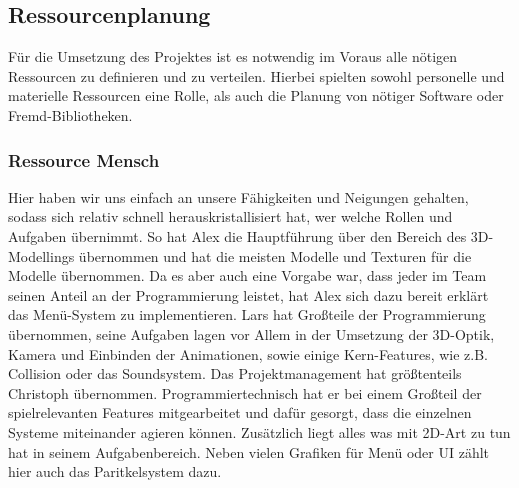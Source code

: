 \documentclass[10pt]{article}
\begin{document}
\vspace{1cm}
\subsection{Ressourcenplanung}
Für die Umsetzung des Projektes ist es notwendig im Voraus alle nötigen Ressourcen zu definieren und zu verteilen. Hierbei spielten sowohl personelle und materielle Ressourcen eine Rolle, als auch die Planung von nötiger Software oder Fremd-Bibliotheken. \newline
\subsubsection{Ressource Mensch}
Hier haben wir uns einfach an unsere Fähigkeiten und Neigungen gehalten, sodass sich relativ schnell herauskristallisiert hat, wer welche Rollen und Aufgaben übernimmt. So hat Alex die Hauptführung über den Bereich des 3D-Modellings übernommen und hat die meisten Modelle und Texturen für die Modelle übernommen.
Da es aber auch eine Vorgabe war, dass jeder im Team seinen Anteil an der Programmierung leistet, hat Alex sich dazu bereit erklärt das Menü-System zu implementieren. \newline
Lars hat Großteile der Programmierung übernommen, seine Aufgaben lagen vor Allem in der Umsetzung der 3D-Optik, Kamera und Einbinden der Animationen, sowie einige Kern-Features, wie z.B. Collision oder das Soundsystem. \newline
Das Projektmanagement hat größtenteils Christoph übernommen. Programmiertechnisch hat er bei einem Großteil der spielrelevanten Features mitgearbeitet und dafür gesorgt, dass die einzelnen Systeme miteinander agieren können. Zusätzlich liegt alles was mit 2D-Art zu tun hat in seinem Aufgabenbereich. Neben vielen Grafiken für Menü oder UI zählt hier auch das Paritkelsystem dazu.
\end{document}
